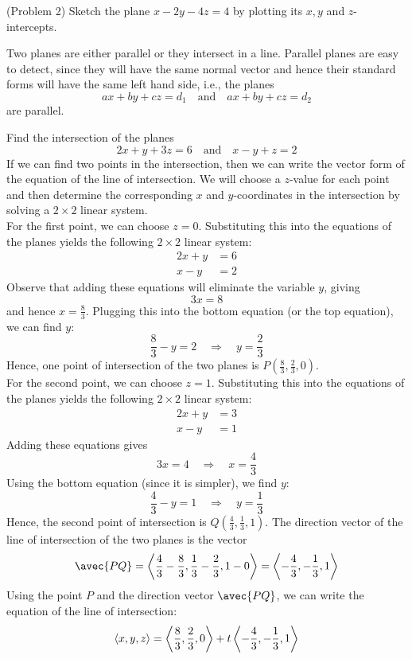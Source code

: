 \documentclass[handout]{ximera}
\begin{document}
\begin{problem}(Problem 2)
Sketch the plane $x - 2y - 4z = 4$ by plotting its $x, y$ and $z$-intercepts.
\end{problem}

Two planes are either parallel or they intersect in a line.
Parallel planes are easy to detect, since they will have the same normal vector and hence their standard forms
will have the same left hand side, i.e., the planes
\[
ax+by+cz = d_1 \quad \text{and} \quad ax+by+cz = d_2
\]
are parallel.


\begin{example}[Example 3]
Find the intersection of the planes 
\[
2x + y + 3z = 6 \quad \text{and} \quad x - y + z = 2
\]
If we can find two points in the intersection, then we can write the vector form of the equation of the line of intersection.
We will choose a $z$-value for each point and then determine the corresponding $x$ and $y$-coordinates in the 
intersection by solving a $2 \times 2$ linear system.\\
For the first point, we can choose $z = 0$. Substituting this into the equations of the planes yields the
following $2 \times 2$ linear system:
\begin{align*}
2x+y &= 6\\
x -y &= 2
\end{align*}
Observe that adding these equations will eliminate the variable $y$,  giving
\[
3x = 8
\]
and hence $x = \frac83$.  Plugging this into the bottom equation (or the top equation), we can find $y$:
\[
 \frac83 -y = 2 \quad \Rightarrow \quad y = \frac23
\]
Hence, one point of intersection of the two planes is $P\left(\frac83, \frac23, 0\right)$.\\
For the second point, we can choose $z = 1$. Substituting this into the equations of the planes yields the 
following $2 \times 2$ linear system:
\begin{align*}
2x + y &= 3\\
x - y &= 1
\end{align*}
Adding these equations gives
\[
3x = 4 \quad \Rightarrow \quad x = \frac43
\]
Using the bottom equation (since it is simpler), we find $y$:
\[
\frac43 - y = 1 \quad \Rightarrow \quad y = \frac13
\]
Hence, the second point of intersection is $Q\left(\frac43, \frac13, 1\right)$.
The direction vector of the line of intersection of the two planes is the vector
\[
\avec{PQ} = \vector{\frac43 - \frac83, \frac13 - \frac23, 1-0} = \vector{-\frac43, -\frac13, 1}
\]
Using the point $P$ and the direction vector $\avec{PQ}$, we can write the equation of the line of intersection:
\[
\left\langle x, y, z\right\rangle = \left\langle \frac83, \frac23, 0\right\rangle + t \left\langle -\frac43, -\frac13, 1\right\rangle
\]

\end{example}
\end{document}

